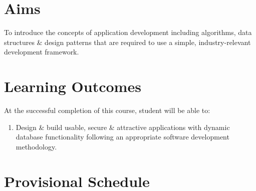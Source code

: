 \documentclass{article}
\begin{document}
\section*{Aims}
To introduce the concepts of application development including algorithms, data structures \& design patterns that are required to use a simple, industry-relevant development framework.

\section*{Learning Outcomes}
At the successful completion of this course, student will be able to:
\begin{enumerate}
	\item Design \& build usable, secure \& attractive applications with dynamic database functionality following an appropriate software development methodology.
\end{enumerate}

\section*{Provisional Schedule}
\end{document}
